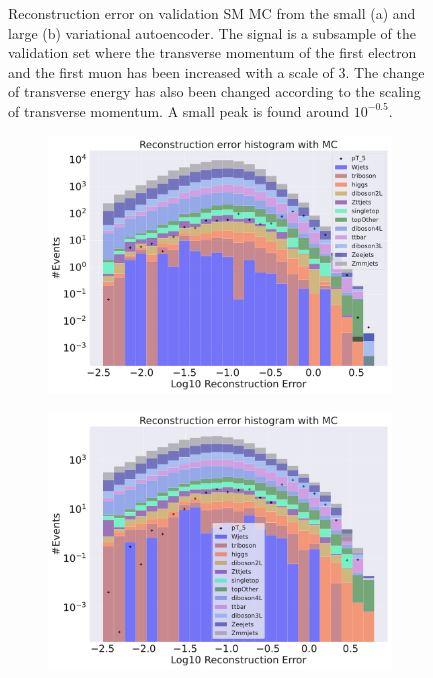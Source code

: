 \begin{figure}[H]
\begin{subfigure}{.45\textwidth}
        \caption{ }
        \label{fig:VAE_big_pt_3}
    \end{subfigure}
    \hfill 
    \caption[VAE | Reconstruction error $p_T$ altering of 3]{Reconstruction error on validation SM MC from the small (a) and large (b) variational autoencoder. The signal is a subsample of the validation 
    set where the transverse momentum of the first electron and the first muon has been increased with a scale of $3$. The change of transverse 
    energy has also been changed according to the scaling of transverse momentum. A small peak is found around $10^{-0.5}$.}
    \label{fig:VAE_big_small_pt_3}
\end{figure}

\begin{figure}[H]
    \centering
    \begin{subfigure}{.45\textwidth}
        \includegraphics[width=\textwidth]{Figures/VAE_testing/small/b_data_recon_big_rm3_feats_sig_pT_5.pdf}
        \caption{}
        \label{fig:VAE_small_pt_5}
    \end{subfigure}
    \hfill 
    \begin{subfigure}{.45\textwidth}
        \includegraphics[width=\textwidth]{Figures/VAE_testing/big/b_data_recon_big_rm3_feats_sig_pT_5.pdf}

\end{subfigure}
\end{figure}
